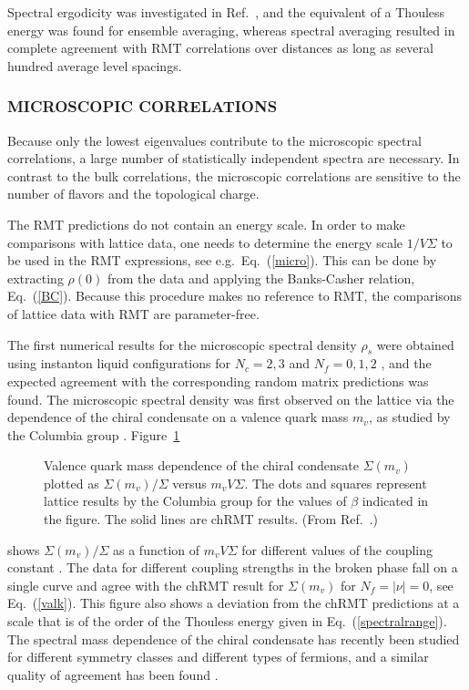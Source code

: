 Spectral ergodicity was investigated in Ref.~\cite{Guhr99}, and the
equivalent of a Thouless energy was found for ensemble averaging,
whereas spectral averaging resulted in complete agreement with RMT
correlations over distances as long as several hundred average level
spacings.


\subsubsection{MICROSCOPIC CORRELATIONS}

Because only the lowest eigenvalues contribute to the microscopic
spectral correlations, a large number of statistically
independent spectra are necessary.  In contrast to
the bulk correlations, the microscopic correlations are sensitive to
the number of flavors and the topological charge.

The RMT predictions do not contain an energy scale.  In order to make
comparisons with lattice data, one needs to determine the energy scale
$1/V\Sigma$ to be used in the RMT expressions, see e.g.\
Eq.~(\ref{micro}).  This can be done by extracting $\rho(0)$ from the
data and applying the Banks-Casher relation, Eq.~(\ref{BC}).  Because
this procedure makes no reference to RMT, the comparisons of lattice
data with RMT are parameter-free.

The first numerical results for the microscopic spectral density
$\rho_s$ were obtained using instanton liquid configurations for
$N_c=2,3$ and $N_f=0,1,2$ \cite{Verb94c}, and the expected agreement
with the corresponding random matrix predictions was found.  The
microscopic spectral density was first observed on the lattice via the
dependence of the chiral condensate on a valence quark mass $m_v$, as
studied by the Columbia group \cite{Chan95}.  Figure~\ref{fig5} 
\begin{figure}
  \begin{center}
    \caption{Valence quark mass dependence of the chiral condensate
      $\Sigma(m_v)$ plotted as $\Sigma(m_v)/\Sigma$ versus $m_v
      V\Sigma$.  The dots and squares represent lattice results by the
      Columbia group \cite{Chan95} for the values of $\beta$ indicated
      in the figure.  The solid lines are chRMT results.  (From
      Ref.~\cite{Verb96}.)}
    \label{fig5}
  \end{center}
\end{figure}
shows $\Sigma(m_v)/\Sigma$ as a function of $m_vV\Sigma$ for different
values of the coupling constant \cite{Verb96}.  The
data for different coupling strengths in the broken phase fall on a
single curve and agree with the chRMT result for
$\Sigma(m_v)$ for $N_f = |\nu |= 0$, see Eq.~(\ref{valk}).  This
figure also shows a deviation from the chRMT predictions at a
scale that is of the order of the Thouless energy given in
Eq.~(\ref{spectralrange}).
The spectral mass dependence of the chiral condensate has recently
been studied for different symmetry classes and different types of
fermions, and a similar quality of agreement has been found
\cite{Damg99b,Hernandezmv}.

